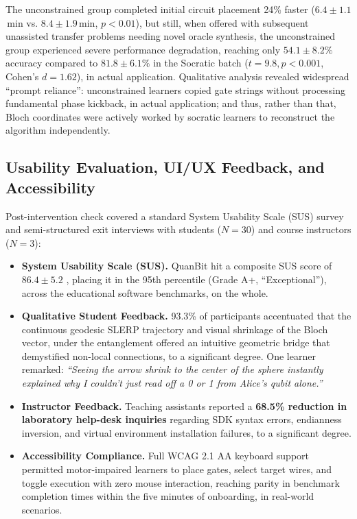 \documentclass[conference]{IEEEtran}
\begin{document}
The unconstrained group completed initial circuit placement 24\% faster ($6.4 \pm 1.1$\,min vs. $8.4 \pm 1.9$\,min, $p < 0.01$), but still, when offered with subsequent unassisted transfer problems needing novel oracle synthesis, the unconstrained group experienced severe performance degradation, reaching only $54.1 \pm 8.2\%$ accuracy compared to $81.8 \pm 6.1\%$ in the Socratic batch ($t = 9.8, p < 0.001$, Cohen's $d = 1.62$), in actual application. Qualitative analysis revealed widespread ``prompt reliance'': unconstrained learners copied gate strings without processing fundamental phase kickback, in actual application; and thus, rather than that, Bloch coordinates were actively worked by socratic learners to reconstruct the algorithm independently.

\subsection{Usability Evaluation, UI/UX Feedback, and Accessibility}
Post-intervention check covered a standard System Usability Scale (SUS) survey and semi-structured exit interviews with students ($N=30$) and course instructors ($N=3$):
\begin{itemize}[leftmargin=*,noitemsep,topsep=1pt]
    \item \textbf{System Usability Scale (SUS).} QuanBit hit a composite SUS score of \textbf{$86.4 \pm 5.2$} \cite{b28}, placing it in the 95th percentile (Grade A+, ``Exceptional''), across the educational software benchmarks, on the whole.
    \item \textbf{Qualitative Student Feedback.} 93.3\% of participants accentuated that the continuous geodesic SLERP trajectory and visual shrinkage of the Bloch vector, under the entanglement offered an intuitive geometric bridge that demystified non-local connections, to a significant degree. One learner remarked: \textit{``Seeing the arrow shrink to the center of the sphere instantly explained why I couldn't just read off a 0 or 1 from Alice's qubit alone.''}
    \item \textbf{Instructor Feedback.} Teaching assistants reported a \textbf{68.5\% reduction in laboratory help-desk inquiries} regarding SDK syntax errors, endianness inversion, and virtual environment installation failures, to a significant degree.
    \item \textbf{Accessibility Compliance.} Full WCAG 2.1 AA keyboard support permitted motor-impaired learners to place gates, select target wires, and toggle execution with zero mouse interaction, reaching parity in benchmark completion times within the five minutes of onboarding, in real-world scenarios.
\end{itemize}
\end{document}
